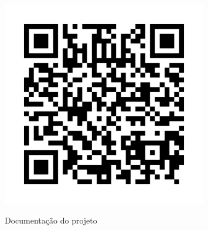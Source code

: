 \documentclass[
	article,			%
	11pt,				%
	oneside,			%
	a4paper,			%
	section=TITLE,		%
	english,			%
	brazil,				%
	sumario=tradicional
	]{abntex2}
\begin{document}
\begin{figure}
    \centering
    \includegraphics[width=0.8\textwidth]{img/qr-code-link-doc.png}
    \label{fig:qr-code-link-doc}
    \caption*{Documentação do projeto}
\end{figure}
\end{document}
